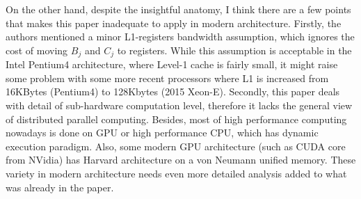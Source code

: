 \documentclass[a4paper,12pt]{article}
\begin{document}
On the other hand, despite the insightful anatomy, I think there are a few points that makes this paper inadequate to apply in modern architecture. Firstly, the authors mentioned a minor L1-registers bandwidth assumption, which ignores the cost of moving $B_j$ and $C_j$ to registers. While this assumption is acceptable in the Intel Pentium4 architecture, where Level-1 cache is fairly small, it might raise some problem with some more recent processors where L1 is increased from 16KBytes (Pentium4) to 128Kbytes (2015 Xeon-E). Secondly, this paper deals with detail of sub-hardware computation level, therefore it lacks the general view of distributed parallel computing. Besides, most of high performance computing nowadays is done on GPU or high performance CPU, which has dynamic execution paradigm. Also, some modern GPU architecture (such as CUDA core from NVidia) has Harvard architecture on a von Neumann unified memory. These variety in modern architecture needs even more detailed analysis added to what was already in the paper.


\end{document}

